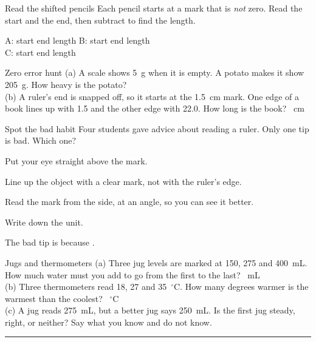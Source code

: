 \begin{puzzle}{Read the shifted pencils}
Each pencil starts at a mark that is \emph{not} zero. Read the start and the end, then subtract to find the length.
\begin{center}
\end{center}
A: start \wline[1.1cm] end \wline[1.1cm] length \wline[1.1cm] \quad B: start \wline[1.1cm] end \wline[1.1cm] length \wline[1.1cm]\\[4pt]
C: start \wline[1.1cm] end \wline[1.1cm] length \wline[1.1cm]
\end{puzzle}

\begin{puzzle}{Zero error hunt}
(a) A scale shows 5~g when it is empty. A potato makes it show 205~g. How heavy is the potato? \wline[2cm]\\[3pt]
(b) A ruler's end is snapped off, so it starts at the 1.5~cm mark. One edge of a book lines up with 1.5 and the other edge with 22.0. How long is the book? \wline[2cm]~cm
\end{puzzle}

\begin{puzzle}{Spot the bad habit}
Four students gave advice about reading a ruler. Only one tip is bad. Which one?
\begin{description}[leftmargin=1.6em,itemsep=0.2em,style=sameline]
\item[A] Put your eye straight above the mark.
\item[B] Line up the object with a clear mark, not with the ruler's edge.
\item[C] Read the mark from the side, at an angle, so you can see it better.
\item[D] Write down the unit.
\end{description}
The bad tip is \wline[1.5cm] because \wline[5cm].
\end{puzzle}

\begin{puzzle}{Jugs and thermometers}
(a) Three jug levels are marked at 150, 275 and 400~mL. How much water must you add to go from the first to the last? \wline[2cm]~mL\\[3pt]
(b) Three thermometers read 18, 27 and 35~$^\circ$C. How many degrees warmer is the warmest than the coolest? \wline[2cm]~$^\circ$C\\[3pt]
(c) A jug reads 275~mL, but a better jug says 250~mL. Is the first jug steady, right, or neither? Say what you know and do not know.\\
\rule{\linewidth}{0.5pt}
\end{puzzle}
\clearpage
